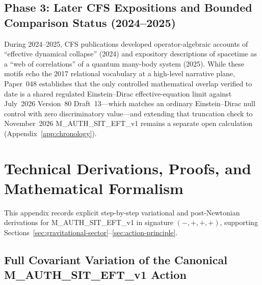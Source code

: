 \documentclass[american,11pt,letterpaper]{article}
\def\texttt#1{#1}%
\def\emph#1{#1}%
\begin{document}
\subsection{Phase 3: Later CFS Expositions and Bounded Comparison Status (2024--2025)}
During 2024--2025, CFS publications developed operator-algebraic accounts of ``effective dynamical collapse'' (2024) and expository descriptions of spacetime as a ``web of correlations'' of a quantum many-body system (2025). While these motifs echo the 2017 relational vocabulary at a high-level narrative plane, Paper~048 establishes that the only controlled mathematical overlap verified to date is a shared regulated Einstein--Dirac effective-equation limit against July~2026 Version~80 Draft~13---which matches an ordinary Einstein--Dirac null control with \emph{zero discriminatory value}---and extending that truncation check to November~2026 \texttt{M\_AUTH\_SIT\_EFT\_v1} remains a separate open calculation (Appendix~\ref{app:chronology}).



\section{Technical Derivations, Proofs, and Mathematical Formalism}
\label{app:tech-derivations}

This appendix records explicit step-by-step variational and post-Newtonian derivations for \texttt{M\_AUTH\_SIT\_EFT\_v1} in signature $(-,+,+,+)$, supporting Sections~\ref{sec:gravitational-sector}--\ref{sec:action-principle}.

\subsection{Full Covariant Variation of the Canonical \texttt{M\_AUTH\_SIT\_EFT\_v1} Action}
\end{document}
